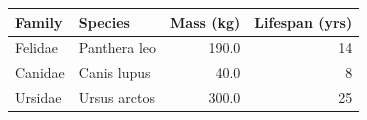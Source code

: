 \documentclass{article}
\begin{document}
\begin{tabular}{llrr}
\toprule
Family & Species & Mass (kg) & Lifespan (yrs) \\
\midrule
Felidae & Panthera leo & 190.0 & 14 \\
Canidae & Canis lupus & 40.0 & 8 \\
Ursidae & Ursus arctos & 300.0 & 25 \\
\bottomrule
\end{tabular}
\end{document}
